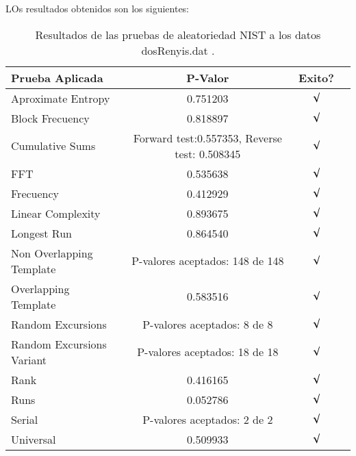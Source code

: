 \documentclass[12pt,3p]{elsarticle}
\begin{document}
LOs resultados obtenidos son los siguientes:

 

\begin{table}[H]
\caption{Resultados de las pruebas de aleatoriedad NIST a los datos dosRenyis.dat .}
\label{sample-table}
\vskip 0.15in
\begin{center}
\begin{small}
\begin{sc}
\begin{tabular}{lccr}
\hline

Prueba Aplicada &  P-Valor & Exito? \\
\hline

Aproximate Entropy    &   0.751203  & $\surd$ \\

Block Frecuency  &   0.818897  &  $\surd$  \\

Cumulative Sums    &   Forward test:0.557353, Reverse test: 0.508345  & $\surd$ \\

FFT    &   0.535638 &   $\surd$      \\

Frecuency     &  0.412929  &  $\surd$   \\

Linear Complexity      &  0.893675  & $\surd$ \\

Longest Run      &  0.864540 &    $\surd$      \\

Non Overlapping Template      & P-valores aceptados: 148 de 148    &     $\surd$          \\

Overlapping Template      &  0.583516  &        $\surd$       \\

Random Excursions      & P-valores aceptados:  8 de 8  &    $\surd$      \\

Random Excursions Variant & P-valores aceptados:  18 de 18 &     $\surd$    \\

Rank &    0.416165  &      $\surd$      \\

Runs &    0.052786 &     $\surd$        \\

Serial &     P-valores aceptados: 2 de 2    &     $\surd$        \\

Universal &      0.509933 &   $\surd$            \\

\hline



\end{tabular}
\end{sc}
\end{small}
\end{center}
\vskip -0.1in
\end{table}
\end{document}
